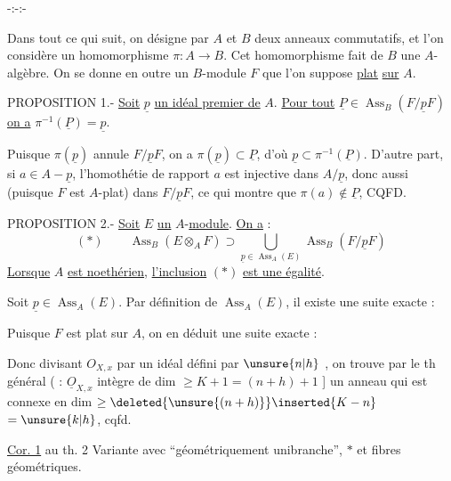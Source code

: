 \begin{center}-:-:-\end{center}

Dans tout ce qui suit, on désigne par $A$ et $B$ deux anneaux commutatifs,
et l'on considère un homomorphisme $\pi:A\longrightarrow B$. Cet homomorphisme fait de
$B$ une $A$-algèbre. On se donne en outre un $B$-module $F$ que l'on suppose \uline{plat}
\uline{sur} $A$.

PROPOSITION 1.- \uline{Soit} $\underline p$ \uline{un idéal premier de} $A$. \uline{Pour tout} $\underline P\in\operatorname{Ass}_B(F/\underline pF)$ \uline{on a}
$\pi^{-1}(\underline P)=\underline p$.

Puisque $\pi(\underline p)$ annule $F/\underline pF$, on a $\pi(\underline p)\subset\underline P$, d'où $\underline p\subset\pi^{-1}(\underline P)$. D'autre
part, si $a\in A-\underline p$, l'homothétie de rapport $a$ est injective dans $A/\underline p$, donc
aussi (puisque $F$ est $A$-plat) dans $F/\underline pF$, ce qui montre que $\pi(a)\notin\underline P$, CQFD.

PROPOSITION 2.- \uline{Soit} $E$ \uline{un} $A$-\uline{module}. \uline{On a} :
\[
(\ast)\qquad
\operatorname{Ass}_B(E\otimes_A F)\supset\bigcup_{\underline p\in\operatorname{Ass}_A(E)}\operatorname{Ass}_B(F/\underline pF)
\]
\uline{Lorsque} $A$ \uline{est noethérien}, \uline{l'inclusion} $(\ast)$ \uline{est une égalité}.

Soit $\underline p\in\operatorname{Ass}_A(E)$. Par définition de $\operatorname{Ass}_A(E)$, il existe une suite exacte :

Puisque $F$ est plat sur $A$, on en déduit une suite exacte :


Donc divisant $O_{X,x}$ par un idéal défini
par $\unsure{n|h}$ , on  trouve par
le th général  ( :
$\underline O_{X,x}$ intègre   de
dim $\geq K+1=(n+h)+1$ ] un anneau
qui est connexe en dim $\geq\deleted{\unsure{(n+h)}}\inserted{K-n}$
$=\unsure{k|h}$, cqfd.

\uline{Cor. 1} au th. 2 Variante
avec  ``géométriquement 
unibranche'', $*$ et fibres géométriques.

